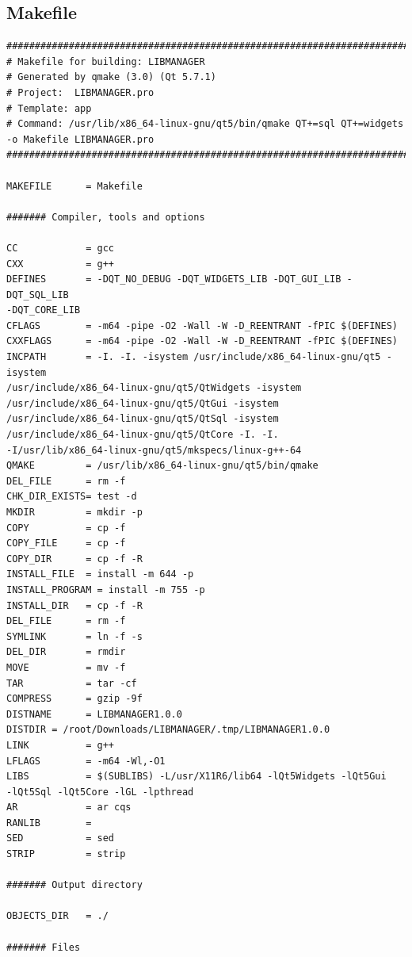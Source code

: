 \documentclass[a4paper]{article}
\begin{document}
\subsection{Makefile}
\begin{verbatim}
#############################################################################
# Makefile for building: LIBMANAGER
# Generated by qmake (3.0) (Qt 5.7.1)
# Project:  LIBMANAGER.pro
# Template: app
# Command: /usr/lib/x86_64-linux-gnu/qt5/bin/qmake QT+=sql QT+=widgets 
-o Makefile LIBMANAGER.pro
#############################################################################

MAKEFILE      = Makefile

####### Compiler, tools and options

CC            = gcc
CXX           = g++
DEFINES       = -DQT_NO_DEBUG -DQT_WIDGETS_LIB -DQT_GUI_LIB -DQT_SQL_LIB 
-DQT_CORE_LIB
CFLAGS        = -m64 -pipe -O2 -Wall -W -D_REENTRANT -fPIC $(DEFINES)
CXXFLAGS      = -m64 -pipe -O2 -Wall -W -D_REENTRANT -fPIC $(DEFINES)
INCPATH       = -I. -I. -isystem /usr/include/x86_64-linux-gnu/qt5 -isystem 
/usr/include/x86_64-linux-gnu/qt5/QtWidgets -isystem 
/usr/include/x86_64-linux-gnu/qt5/QtGui -isystem 
/usr/include/x86_64-linux-gnu/qt5/QtSql -isystem 
/usr/include/x86_64-linux-gnu/qt5/QtCore -I. -I. 
-I/usr/lib/x86_64-linux-gnu/qt5/mkspecs/linux-g++-64
QMAKE         = /usr/lib/x86_64-linux-gnu/qt5/bin/qmake
DEL_FILE      = rm -f
CHK_DIR_EXISTS= test -d
MKDIR         = mkdir -p
COPY          = cp -f
COPY_FILE     = cp -f
COPY_DIR      = cp -f -R
INSTALL_FILE  = install -m 644 -p
INSTALL_PROGRAM = install -m 755 -p
INSTALL_DIR   = cp -f -R
DEL_FILE      = rm -f
SYMLINK       = ln -f -s
DEL_DIR       = rmdir
MOVE          = mv -f
TAR           = tar -cf
COMPRESS      = gzip -9f
DISTNAME      = LIBMANAGER1.0.0
DISTDIR = /root/Downloads/LIBMANAGER/.tmp/LIBMANAGER1.0.0
LINK          = g++
LFLAGS        = -m64 -Wl,-O1
LIBS          = $(SUBLIBS) -L/usr/X11R6/lib64 -lQt5Widgets -lQt5Gui 
-lQt5Sql -lQt5Core -lGL -lpthread 
AR            = ar cqs
RANLIB        = 
SED           = sed
STRIP         = strip

####### Output directory

OBJECTS_DIR   = ./

####### Files


\end{verbatim}
\end{document}
